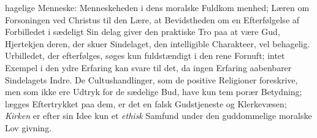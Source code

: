 \documentclass[12pt,a4paper]{book}
\begin{document}
hagelige Menneske: Menneskeheden i dens moralske Fuldkom\-%
menhed; Læren om Forsoningen ved Christus til den Lære, at
Bevidstheden om en Efterfølgelse af Forbilledet i sædeligt Sin\-%
delag giver den praktiske Tro paa at være Gud, Hjertekjen\-%
deren, der skuer Sindelaget, den intelligible Charakteer, vel\-%
behagelig. Urbilledet, der efterfølges, søges kun fuldstændigt
i den rene Fornuft; intet Exempel i den ydre Erfaring kan
svare til det, da ingen Erfaring aabenbarer Sindelagets Indre.
De Cultushandlinger, som de positive Religioner foreskrive,
men som ikke ere Udtryk for de sædelige Bud, have kun tem\-%
porær Betydning; lægges Eftertrykket paa dem, er det en falsk
Gudstjeneste og Klerkevæsen; \emph{Kirken} er efter sin Idee kun
et \emph{ethisk} Samfund under den guddommelige moralske Lov\-%
givning.
\end{document}
